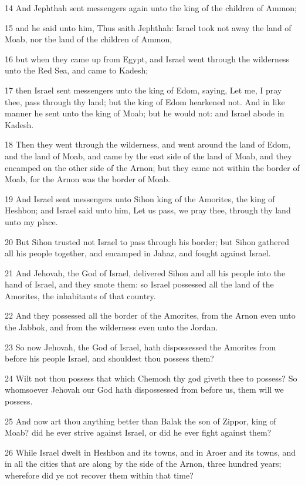 \par 14 And Jephthah sent messengers again unto the king of the children of Ammon;
\par 15 and he said unto him, Thus saith Jephthah: Israel took not away the land of Moab, nor the land of the children of Ammon,
\par 16 but when they came up from Egypt, and Israel went through the wilderness unto the Red Sea, and came to Kadesh;
\par 17 then Israel sent messengers unto the king of Edom, saying, Let me, I pray thee, pass through thy land; but the king of Edom hearkened not. And in like manner he sent unto the king of Moab; but he would not: and Israel abode in Kadesh.
\par 18 Then they went through the wilderness, and went around the land of Edom, and the land of Moab, and came by the east side of the land of Moab, and they encamped on the other side of the Arnon; but they came not within the border of Moab, for the Arnon was the border of Moab.
\par 19 And Israel sent messengers unto Sihon king of the Amorites, the king of Heshbon; and Israel said unto him, Let us pass, we pray thee, through thy land unto my place.
\par 20 But Sihon trusted not Israel to pass through his border; but Sihon gathered all his people together, and encamped in Jahaz, and fought against Israel.
\par 21 And Jehovah, the God of Israel, delivered Sihon and all his people into the hand of Israel, and they smote them: so Israel possessed all the land of the Amorites, the inhabitants of that country.
\par 22 And they possessed all the border of the Amorites, from the Arnon even unto the Jabbok, and from the wilderness even unto the Jordan.
\par 23 So now Jehovah, the God of Israel, hath dispossessed the Amorites from before his people Israel, and shouldest thou possess them?
\par 24 Wilt not thou possess that which Chemosh thy god giveth thee to possess? So whomsoever Jehovah our God hath dispossessed from before us, them will we possess.
\par 25 And now art thou anything better than Balak the son of Zippor, king of Moab? did he ever strive against Israel, or did he ever fight against them?
\par 26 While Israel dwelt in Heshbon and its towns, and in Aroer and its towns, and in all the cities that are along by the side of the Arnon, three hundred years; wherefore did ye not recover them within that time?
